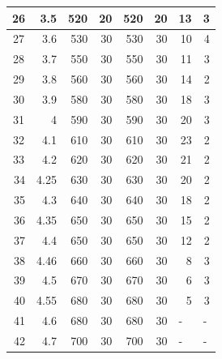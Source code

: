\documentclass{article}
\begin{document}
\begin{table}[h!]
\begin{tabular}{|c|r|r|r|r|r|r|r|}
26                       & 3.5  & 520 & 20 & 520 & 20 & 13                     & 3                      \\ \hline
27                       & 3.6  & 530 & 30 & 530 & 30 & 10                     & 4                      \\ \hline
28                       & 3.7  & 550 & 30 & 550 & 30 & 11                     & 3                      \\ \hline
29                       & 3.8  & 560 & 30 & 560 & 30 & 14                     & 2                      \\ \hline
30                       & 3.9  & 580 & 30 & 580 & 30 & 18                     & 3                      \\ \hline
31                       & 4    & 590 & 30 & 590 & 30 & 20                     & 3                      \\ \hline
32                       & 4.1  & 610 & 30 & 610 & 30 & 23                     & 2                      \\ \hline
33                       & 4.2  & 620 & 30 & 620 & 30 & 21                     & 2                      \\ \hline
\multicolumn{1}{|r|}{34} & 4.25 & 630 & 30 & 630 & 30 & 20                     & 2                      \\ \hline
\multicolumn{1}{|r|}{35} & 4.3  & 640 & 30 & 640 & 30 & 18                     & 2                      \\ \hline
\multicolumn{1}{|r|}{36} & 4.35 & 650 & 30 & 650 & 30 & 15                     & 2                      \\ \hline
\multicolumn{1}{|r|}{37} & 4.4  & 650 & 30 & 650 & 30 & 12                     & 2                      \\ \hline
\multicolumn{1}{|r|}{38} & 4.46 & 660 & 30 & 660 & 30 & 8                      & 3                      \\ \hline
\multicolumn{1}{|r|}{39} & 4.5  & 670 & 30 & 670 & 30 & 6                      & 3                      \\ \hline
\multicolumn{1}{|r|}{40} & 4.55 & 680 & 30 & 680 & 30 & 5                      & 3                      \\ \hline
\multicolumn{1}{|r|}{41} & 4.6  & 680 & 30 & 680 & 30 & \multicolumn{1}{l|}{-} & \multicolumn{1}{l|}{-} \\ \hline
\multicolumn{1}{|r|}{42} & 4.7  & 700 & 30 & 700 & 30 & \multicolumn{1}{l|}{-} & \multicolumn{1}{l|}{-} \\ \hline

\end{tabular}
\end{table}
\end{document}
